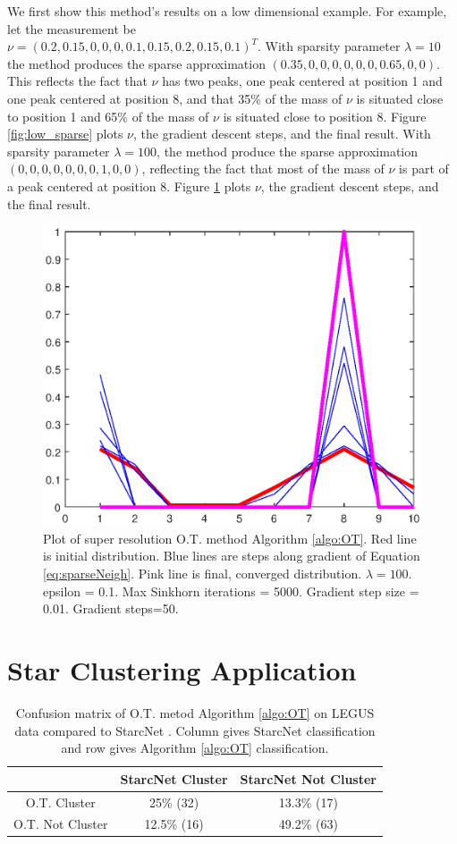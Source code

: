 \documentclass[conference]{IEEEtran}
\begin{document}
We first show this method's results on a low dimensional example. For example, let the measurement be \\
$ \nu = (0.2, 0.15, 0, 0, 0, 0.1, 0.15, 0.2, 0.15, 0.1)^T. $ 
With sparsity parameter $\lambda = 10$  the method produces the sparse approximation $(0.35,0,0,0,0,0,0,0.65,0,0)$.
This reflects the fact that $\nu$ has two peaks, one peak centered at position 1 and one peak centered at position 8, and that 35\% of the mass of $\nu$ is situated close to position 1 and 65\% of the mass of $\nu$ is situated close to position 8. Figure \ref{fig:low_sparse} plots $\nu$, the gradient descent steps, and the final result.
With sparsity parameter $\lambda = 100$, the method produce the sparse approximation $(0,0,0,0,0,0,0,1,0,0)$, reflecting the fact that most of the mass of $\nu$ is part of a peak centered at position 8. Figure \ref{fig:high_sparse} plots $\nu$, the gradient descent steps, and the final result.

\begin{figure}[t]
\centerline{\includegraphics[width=.5\textwidth]{OT_gradient_descent_1D_lambda=100.eps}}
\caption{
Plot of super resolution O.T. method Algorithm \ref{algo:OT}. Red line is initial distribution. Blue lines are steps along gradient of Equation \eqref{eq:sparseNeigh}. Pink line is final, converged distribution. $\lambda=100$.
epsilon = 0.1. Max Sinkhorn iterations = 5000. Gradient step size = 0.01. Gradient steps=50.}
\label{fig:high_sparse}
\end{figure}

\section{Star Clustering Application}\label{sec:Star}

\begin{table}[h]
\caption{Confusion matrix of O.T. metod Algorithm \ref{algo:OT} on LEGUS data compared to StarcNet \cite{perez}. Column gives StarcNet classification and row gives Algorithm \ref{algo:OT} classification.}
\begin{center}
\begin{tabular}{c|c|c|}
 & StarcNet Cluster & StarcNet Not Cluster \\
\hline
O.T. Cluster     & 25\% (32) & 13.3\% (17)  \\
\hline
O.T. Not Cluster & 12.5\% (16) & 49.2\% (63)  \\
\hline
\end{tabular}
\label{table:2}
\end{center}
\end{table}
\end{document}
